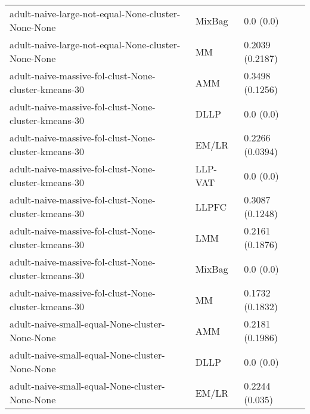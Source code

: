 \begin{longtable}{lll}
                                                           adult-naive-large-not-equal-None-cluster-None-None &    MixBag &                             0.0 (0.0) \\
                                                           adult-naive-large-not-equal-None-cluster-None-None &        MM &                       0.2039 (0.2187) \\
                                                         adult-naive-massive-fol-clust-None-cluster-kmeans-30 &       AMM &                       0.3498 (0.1256) \\
                                                         adult-naive-massive-fol-clust-None-cluster-kmeans-30 &      DLLP &                             0.0 (0.0) \\
                                                         adult-naive-massive-fol-clust-None-cluster-kmeans-30 &     EM/LR &                       0.2266 (0.0394) \\
                                                         adult-naive-massive-fol-clust-None-cluster-kmeans-30 &   LLP-VAT &                             0.0 (0.0) \\
                                                         adult-naive-massive-fol-clust-None-cluster-kmeans-30 &     LLPFC &                       0.3087 (0.1248) \\
                                                         adult-naive-massive-fol-clust-None-cluster-kmeans-30 &       LMM &                       0.2161 (0.1876) \\
                                                         adult-naive-massive-fol-clust-None-cluster-kmeans-30 &    MixBag &                             0.0 (0.0) \\
                                                         adult-naive-massive-fol-clust-None-cluster-kmeans-30 &        MM &                       0.1732 (0.1832) \\
                                                               adult-naive-small-equal-None-cluster-None-None &       AMM &                       0.2181 (0.1986) \\
                                                               adult-naive-small-equal-None-cluster-None-None &      DLLP &                             0.0 (0.0) \\
                                                               adult-naive-small-equal-None-cluster-None-None &     EM/LR &                        0.2244 (0.035) \\

\end{longtable}
